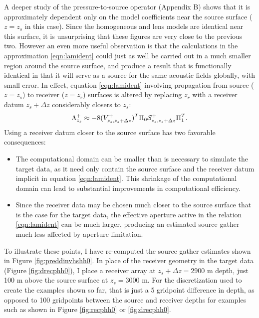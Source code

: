 A deeper study of the pressure-to-source
operator (Appendix B) shows that it is approximately dependent only on the model
coefficients near the source surface ($z=z_s$ in this case). Since the
homogeneous and lens models are identical near this surface, it is
unsurprising that these figures are very close to the previous two.
However an even more useful observation is that the calculations in
the approximation \ref{eqn:lamident} could just as well be carried out
in a much smaller region around the source surface, and produce a
result that is functionally identical in that it will serve as a
source for the same acoustic fields globally, with small error. In
effect, equation \ref{eqn:lamident} involving propagation from source
($z=z_s$) to receiver ($z=z_r$) surfaces is altered by replacing $z_r$
with a receiver datum $z_s+\Delta z$ considerably closers to $z_s$:
\begin{equation}
  \label{eqn:lamnear}
  \Lambda^+_{z_s} \approx -8(V^{+}_{z_s,z_s+\Delta z})^T\Pi_0 {\cal
    S}^+_{z_s,z_s+\Delta z}\Pi_1^T.
\end{equation}
Using a receiver datum closer to the source surface has two favorable consequences:
\begin{itemize}
\item The computational domain can be smaller than is necessary to
  simulate the target data, as it need only contain the source
  surface and the receiver datum implicit in
  equation \ref{eqn:lamident}. This shrinkage of the computational
  domain can lead to substantial improvements in computational
  efficiency.
\item Since the receiver data may be chosen much closer to the
  source surface that is the case for the target data, the effective
  aperture active in the relation \ref{eqn:lamident} can be much
  larger, producing an estimated source gather much less affected by
  aperture limitation.
\end{itemize}

To illustrate these points, I have re-computed the source gather
estimates shown in Figure \ref{fig:preddinvhshh0}. In place of the receiver geometry in the
target data (Figure \ref{fig:drecphh0}), I
place a receiver array at $z_s+\Delta z=2900$ m depth, just 100 m above the
source surface at $z_s=3000$ m. For the discretization used to create
the examples shown so far, that is just a 5 gridpoint difference in
depth, as opposed to 100 gridpoints between the source and receiver
depths for examples such as shown in Figure \ref{fig:recphh0} or
\ref{fig:drecphh0}.


